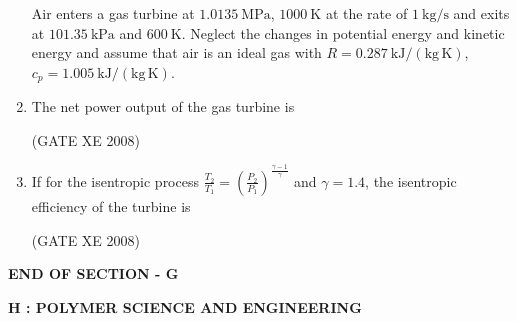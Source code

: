 \documentclass[12pt]{article}
\begin{document}
\begin{enumerate}
Air enters a gas turbine at $1.0135~\mathrm{MPa}$, $1000~\mathrm{K}$ at the rate of $1~\mathrm{kg/s}$ and exits at $101.35~\mathrm{kPa}$ and $600~\mathrm{K}$.  
Neglect the changes in potential energy and kinetic energy and assume that air is an ideal gas with $R = 0.287~\mathrm{kJ/(kg\,K)}$, $c_p = 1.005~\mathrm{kJ/(kg\,K)}$.  

\item The net power output of the gas turbine is 

\begin{enumerate}
\end{enumerate}

(GATE XE 2008)  

\item If for the isentropic process  
$
\frac{T_2}{T_1} = \left( \frac{P_2}{P_1} \right)^{\frac{\gamma-1}{\gamma}}
$ 
and $\gamma = 1.4$, the isentropic efficiency of the turbine is  

\begin{enumerate}
\end{enumerate}

(GATE XE 2008)  

\end{enumerate}

\begin{center}
    \textbf{END OF SECTION - G}
\end{center}

\newpage

\begin{center}
    \textbf{\Large H : POLYMER SCIENCE AND ENGINEERING}
\end{center}
\end{document}
